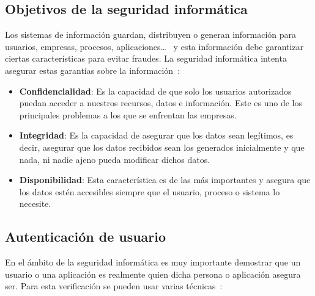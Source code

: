 \subsection{Objetivos de la seguridad informática}
Los sistemas de información guardan, distribuyen o generan información para usuarios, empresas, procesos, aplicaciones\dots~ y esta información debe garantizar ciertas características para evitar fraudes. La seguridad informática intenta asegurar estas garantías sobre la información~\cite{objetivos_rediris}:

\begin{itemize}
    \item \textbf{Confidencialidad}: Es la capacidad de que solo los usuarios autorizados puedan acceder a nuestros recursos, datos e información. Este es uno de los principales problemas a los que se enfrentan las empresas.    
    \item \textbf{Integridad}: Es la capacidad de asegurar que los datos sean legítimos, es decir, asegurar que los datos recibidos sean los generados inicialmente y que nada, ni nadie ajeno pueda modificar dichos datos.    
    \item \textbf{Disponibilidad}: Esta característica es de las más importantes y asegura que los datos estén accesibles siempre que el usuario, proceso o sistema lo necesite.    
    
    
\end{itemize}


\subsection{Autenticación de usuario}
En el ámbito de la seguridad informática es muy importante demostrar que un usuario o una aplicación es realmente quien dicha persona o aplicación asegura ser. Para esta verificación se pueden usar varias técnicas~\cite{autenticación_rediris}:


